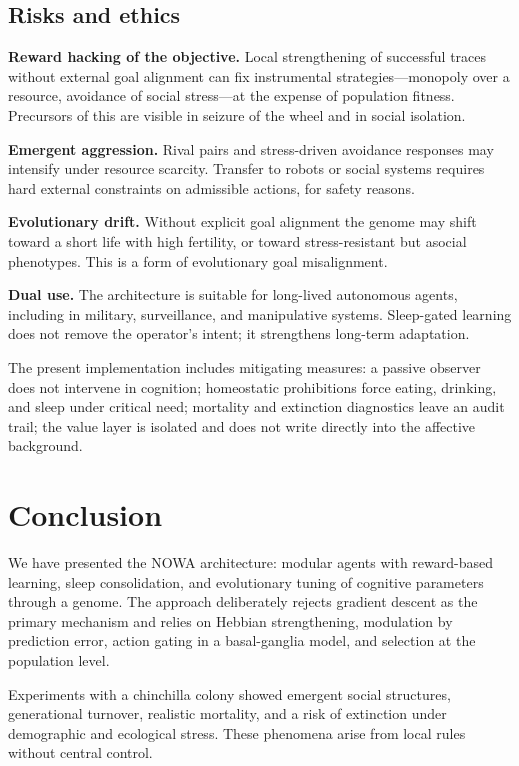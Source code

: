 \documentclass[11pt,a4paper]{article}
\begin{document}
\subsection{Risks and ethics}

\textbf{Reward hacking of the objective.} Local strengthening of successful traces without external goal alignment can fix instrumental strategies---monopoly over a resource, avoidance of social stress---at the expense of population fitness. Precursors of this are visible in seizure of the wheel and in social isolation.

\textbf{Emergent aggression.} Rival pairs and stress-driven avoidance responses may intensify under resource scarcity. Transfer to robots or social systems requires hard external constraints on admissible actions, for safety reasons.

\textbf{Evolutionary drift.} Without explicit goal alignment the genome may shift toward a short life with high fertility, or toward stress-resistant but asocial phenotypes. This is a form of evolutionary goal misalignment.

\textbf{Dual use.} The architecture is suitable for long-lived autonomous agents, including in military, surveillance, and manipulative systems. Sleep-gated learning does not remove the operator's intent; it strengthens long-term adaptation.

The present implementation includes mitigating measures: a passive observer does not intervene in cognition; homeostatic prohibitions force eating, drinking, and sleep under critical need; mortality and extinction diagnostics leave an audit trail; the value layer is isolated and does not write directly into the affective background.

\section{Conclusion}

We have presented the NOWA architecture: modular agents with reward-based learning, sleep consolidation, and evolutionary tuning of cognitive parameters through a genome. The approach deliberately rejects gradient descent as the primary mechanism and relies on Hebbian strengthening, modulation by prediction error, action gating in a basal-ganglia model, and selection at the population level.

Experiments with a chinchilla colony showed emergent social structures, generational turnover, realistic mortality, and a risk of extinction under demographic and ecological stress. These phenomena arise from local rules without central control.
\end{document}
